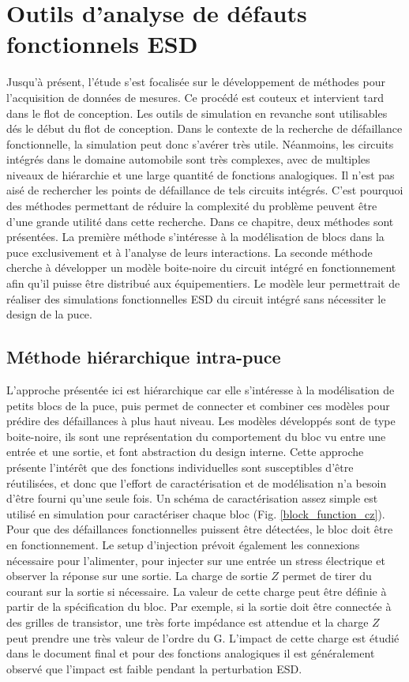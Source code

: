 \chapter{Outils d'analyse de défauts fonctionnels ESD}
\label{chap:4}

Jusqu'à présent, l'étude s'est focalisée sur le développement de méthodes pour l'acquisition de données de mesures.
Ce procédé est couteux et intervient tard dans le flot de conception.
Les outils de simulation en revanche sont utilisables dés le début du flot de conception.
Dans le contexte de la recherche de défaillance fonctionnelle, la simulation peut donc s'avérer très utile.
Néanmoins, les circuits intégrés dans le domaine automobile sont très complexes, avec de multiples niveaux de hiérarchie et une large quantité de fonctions analogiques.
Il n'est pas aisé de rechercher les points de défaillance de tels circuits intégrés.
C'est pourquoi des méthodes permettant de réduire la complexité du problème peuvent être d'une grande utilité dans cette recherche.
Dans ce chapitre, deux méthodes sont présentées.
La première méthode s'intéresse à la modélisation de blocs dans la puce exclusivement et à l'analyse de leurs interactions.
La seconde méthode cherche à développer un modèle boite-noire du circuit intégré en fonctionnement afin qu'il puisse être distribué aux équipementiers.
Le modèle leur permettrait de réaliser des simulations fonctionnelles ESD du circuit intégré sans nécessiter le design de la puce.

\section{Méthode hiérarchique intra-puce}

L'approche présentée ici est hiérarchique car elle s'intéresse à la modélisation de petits blocs de la puce, puis permet de connecter et combiner ces modèles pour prédire des défaillances à plus haut niveau.
Les modèles développés sont de type boite-noire, ils sont une représentation du comportement du bloc vu entre une entrée et une sortie, et font abstraction du design interne.
Cette approche présente l'intérêt que des fonctions individuelles sont susceptibles d'être réutilisées, et donc que l'effort de caractérisation et de modélisation n'a besoin d'être fourni qu'une seule fois.
Un schéma de caractérisation assez simple est utilisé en simulation pour caractériser chaque bloc (Fig. \ref{block_function_cz}).
Pour que des défaillances fonctionnelles puissent être détectées, le bloc doit être en fonctionnement.
Le setup d'injection prévoit également les connexions nécessaire pour l'alimenter, pour injecter sur une entrée un stress électrique et observer la réponse sur une sortie.
La charge de sortie $Z$ permet de tirer du courant sur la sortie si nécessaire.
La valeur de cette charge peut être définie à partir de la spécification du bloc.
Par exemple, si la sortie doit être connectée à des grilles de transistor, une très forte impédance est attendue et la charge $Z$ peut prendre une très valeur de l'ordre du G\textOmega{}.
L'impact de cette charge est étudié dans le document final et pour des fonctions analogiques il est généralement observé que l'impact est faible pendant la perturbation ESD.

